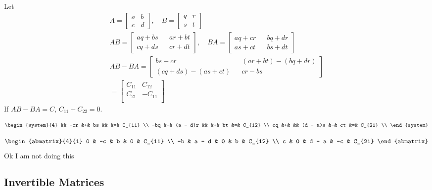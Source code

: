 \documentclass{article}
\begin{document}
\begin{enumerate}[listparindent=\parindent]
Let
\begin{gather*}
    A = \begin{bmatrix}
        a & b \\
        c & d
    \end{bmatrix}, \quad
    B = \begin{bmatrix}
        q & r \\
        s & t
    \end{bmatrix}
    \\
    AB = \begin{bmatrix}
        aq + bs && ar + bt \\
        cq + ds && cr + dt
    \end{bmatrix}, \quad
    BA = \begin{bmatrix}
        aq + cr && bq + dr \\
        as + ct && bs + dt
    \end{bmatrix}
    \\
    AB - BA = \begin{bmatrix}
        bs - cr && (ar + bt) - (bq + dr) \\
        (cq + ds) - (as + ct) && cr - bs
    \end{bmatrix}
    \\
    = \begin{bmatrix}
        C_{11} & C_{12} \\
        C_{21} & -C_{11} \\
    \end{bmatrix}
\end{gather*}
If \(AB - BA = C\), \(C_{11} + C_{22} = 0\).

\[
    \begin{system}{4}
        && -cr &+& bs && &=& C_{11} \\
        -bq &+& (a - d)r && &+& bt &=& C_{12} \\
        cq &+& && (d - a)s &-& ct &=& C_{21} \\
    \end{system}
\]

\[
    \begin{abmatrix}{4}{1}
        0 & -c & b & 0 & C_{11} \\
        -b & a - d & 0 & b & C_{12} \\
        c & 0 & d - a & -c & C_{21}
    \end{abmatrix}
\]
Ok I am not doing this

\end{enumerate}

\subsection{Invertible Matrices}
\end{document}
